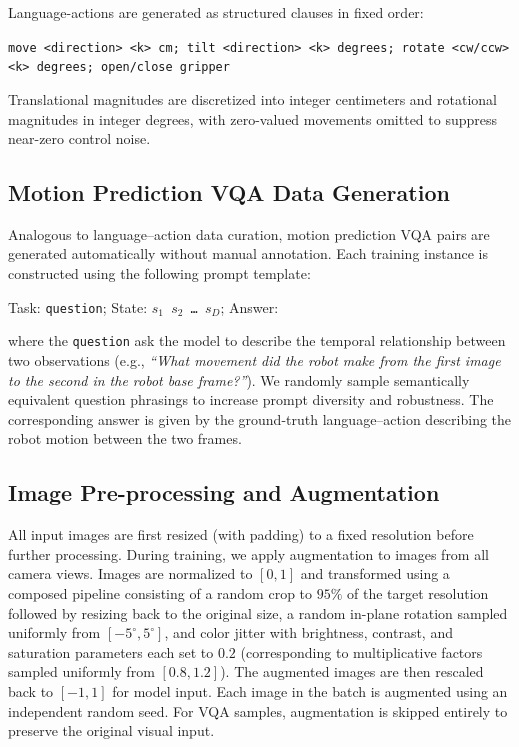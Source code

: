 Language-actions are generated as structured clauses in fixed order:

\begin{tcolorbox}[promptbox]
\texttt{move <direction> <k> cm; tilt <direction> <k> degrees; rotate <cw/ccw> <k> degrees; open/close gripper}
\end{tcolorbox}

Translational magnitudes are discretized into integer centimeters and rotational magnitudes in integer degrees, with zero-valued movements omitted to suppress near-zero control noise.

\subsection{Motion Prediction VQA Data Generation}
Analogous to language–action data curation, motion prediction VQA pairs are generated automatically without manual annotation. Each training instance is constructed using the following prompt template:
\begin{tcolorbox}[promptbox]
Task: \texttt{question}; State: \texttt{$s_1$\ $s_2$\ \ldots\ $s_D$}; Answer:
\end{tcolorbox}
\noindent where the \texttt{question} ask the model to describe the temporal relationship between two observations (e.g., \emph{“What movement did the robot make from the first image to the second in the robot base frame?”}). We randomly sample semantically equivalent question phrasings to increase prompt diversity and robustness. The corresponding answer is given by the ground-truth language–action describing the robot motion between the two frames.

\subsection{Image Pre-processing and Augmentation}
All input images are first resized (with padding) to a fixed resolution before further processing. During training, we apply augmentation to images from all camera views. Images are normalized to $[0,1]$ and transformed using a composed pipeline consisting of a random crop to $95\%$ of the target resolution followed by resizing back to the original size, a random in-plane rotation sampled uniformly from $[-5^\circ, 5^\circ]$, and color jitter with brightness, contrast, and saturation parameters each set to $0.2$ (corresponding to multiplicative factors sampled uniformly from $[0.8, 1.2]$). The augmented images are then rescaled back to $[-1,1]$ for model input. Each image in the batch is augmented using an independent random seed. For VQA samples, augmentation is skipped entirely to preserve the original visual input.


